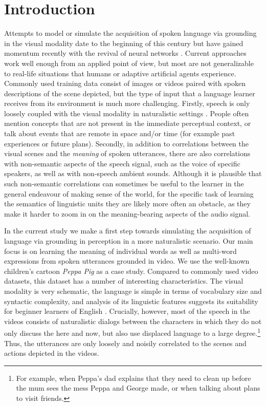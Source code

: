 \section{Introduction}
\label{sec:intro}

Attempts to model or simulate the acquisition of spoken language via
grounding in the visual modality date to the beginning of this century
\citep{roypentland2002learning} but have gained momentum recently
with the revival of neural networks
\citep[e.g.][]{synnaeve2014learning,harwath2015deep,
  harwath2016unsupervised,chrupala-etal-2017-representations,alishahi-etal-2017-encoding,harwath2018jointly,Merkx2019,havard2019models,rouditchenko2020avlnet,khorrami_2021,peng2021fastslow}.
Current approaches work well enough from an applied point of view, 
but most are not generalizable to real-life situations that humans or 
adaptive artificial agents experience. Commonly used training data
consist of images or videos paired with spoken descriptions
of the scene depicted, but the type of input that a language learner receives 
from its environment is much more challenging.  
Firstly, speech is only loosely coupled with the visual modality in naturalistic settings
 \citep{matusevych2013automatic, beekhuizen2013word}. People often mention 
 concepts that are not present in the immediate perceptual context, 
 or talk about events that are remote in space and/or time (for example past experiences or future plans).
Secondly, in addition to
correlations between the visual scenes and the {\it meaning} of spoken
utterances, there are also correlations with non-semantic aspects of
the speech signal, such as the voice of specific speakers, as well
as with non-speech ambient sounds. Although it is plausible that such
non-semantic correlations can sometimes be useful to the learner in
the general endeavour of making sense of the world, for the specific
task of learning the semantics of linguistic units they are likely more
often an obstacle, as they make it harder to zoom in on the
meaning-bearing aspects of the audio signal.

In the current study we make a first step towards simulating the
acquisition of language via grounding in perception in a more naturalistic
scenario.  Our main focus is on learning the meaning of individual words 
as well as multi-word expressions from spoken utterances grounded in video.  
We use the well-known children's cartoon {\it Peppa Pig} as
a case study. Compared to
commonly used video datasets, this dataset has a number of interesting
characteristics.  The visual modality is very schematic,  the
language is simple in terms of vocabulary size and syntactic
complexity, and analysis of its linguistic features suggests its suitability for beginner learners of English \cite{kokla2021peppa,scheffler2021peppa}.
Crucially, however, most of the speech in the videos
consists of naturalistic dialogs between the characters in which they do not 
only discuss the here and now, but also use displaced language to a large 
degree.\footnote{For example, when Peppa's dad explains that they need to 
clean up before the mum sees the mess Peppa and George made, or when talking 
about plans to visit friends.} 
Thus, the utterances are only loosely and noisily correlated to the scenes and
actions depicted in the videos. 

